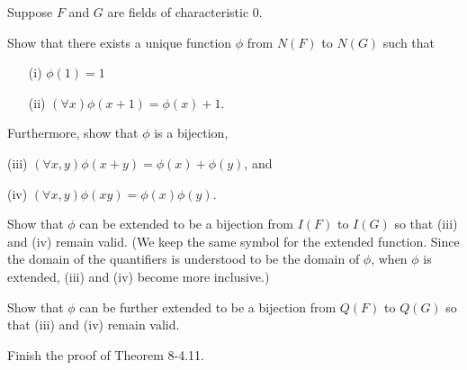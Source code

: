 \begin{exercise}
Suppose $F$ and $G$ are fields of characteristic 0.
\begin{enumalpha}
    \item Show that there exists a unique function $\phi$ from $N(F)$ to $N(G)$ such that
    \begin{enumerate}
        \item[(i)] $\phi(1)=1$
        \item[(ii)] $(\forall x)\phi(x+1)=\phi(x)+1$.
    \end{enumerate}
    Furthermore, show that $\phi$ is a bijection,
    \begin{enumroman}
        \item[(iii)] $(\forall x,y)\phi(x+y)=\phi(x)+\phi(y)$, and
        \item[(iv)] $(\forall x,y)\phi(xy)=\phi(x)\phi(y)$.
    \end{enumroman}

    \item Show that $\phi$ can be extended to be a bijection from $I(F)$ to $I(G)$ so that (iii) and
    (iv) remain valid. (We keep the same symbol for the extended function. Since the
    domain of the quantifiers is understood to be the domain of $\phi$, when $\phi$ is extended,
    (iii) and (iv) become more inclusive.)

    \item Show that $\phi$ can be further extended to be a bijection from $Q(F)$ to $Q(G)$ so that
    (iii) and (iv) remain valid.

    \item Finish the proof of Theorem 8-4.11.
\end{enumalpha}
\end{exercise}

